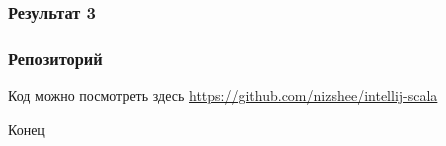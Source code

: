 \documentclass{beamer}
\begin{document}
\begin{frame}
\frametitle{Результат 3}
\end{frame}

\begin{frame}
\frametitle{Репозиторий}
Код можно посмотреть здесь
\url{https://github.com/nizshee/intellij-scala}
\end{frame}

\begin{frame}
\Huge{\centerline{Конец}}
\end{frame}
\end{document}
